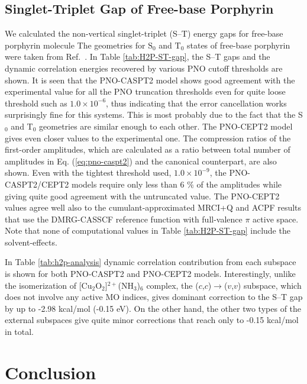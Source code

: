 \documentclass[aip,jcp,amsmath]{revtex4-1}
\begin{document}
\subsection{Singlet-Triplet Gap of Free-base Porphyrin}
%
We calculated the non-vertical singlet-triplet (S--T) energy gaps for free-base porphyrin molecule
%
The geometries for $\text{S}_0$ and $\text{T}_0$ states of free-base porphyrin were taken from Ref.~.
%
In Table \ref{tab:H2P-ST-gap}, the S--T gaps and the dynamic correlation energies recovered by various PNO cutoff thresholds are shown.
%
It is seen that the PNO-CASPT2 model shows good agreement with the experimental value for all the PNO truncation thresholds even for quite loose threshold such as $1.0\times 10^{-6}$, thus indicating that the error cancellation works surprisingly fine for this systems.
%
This is most probably due to the fact that the S${}_0$ and T${}_0$ geometries are similar enough to each other.
%
The PNO-CEPT2 model gives even closer values to the experimental one.
%
The compression ratios of the first-order amplitudes, which are calculated as a ratio between total number of amplitudes in Eq. (\ref{eq:pno-caspt2}) and the canonical counterpart, are also shown.
%
Even with the tightest threshold used, $1.0\times 10^{-9}$, the PNO-CASPT2/CEPT2 models require only less than 6 $\%$ of the amplitudes while giving quite good agreement with the untruncated value.
%
The PNO-CEPT2 values agree well also to the cumulant-approximated MRCI+Q and ACPF results that use the DMRG-CASSCF reference function with full-valence $\pi$ active space.
%
Note that none of computational values in Table \ref{tab:H2P-ST-gap} include the solvent-effects.

%
In Table \ref{tab:h2p-analysis} dynamic correlation contribution from each subspace is shown for both PNO-CASPT2 and PNO-CEPT2 models.
%
Interestingly, unlike the isomerization of [Cu${}_2$O${}_2$]${}^{2+}$(NH${}_3$)${}_{6}$ complex, the ($c$,$c$)$\rightarrow$($v$,$v$) subspace, which does not involve any active MO indices, gives dominant correction to the S--T gap by up to -2.98 kcal/mol (-0.15 eV).
%
On the other hand, the other two types of the external subspaces give quite minor corrections that reach only to -0.15 kcal/mol in total.


\section{Conclusion}\label{Sec:Conclusion}
\end{document}
